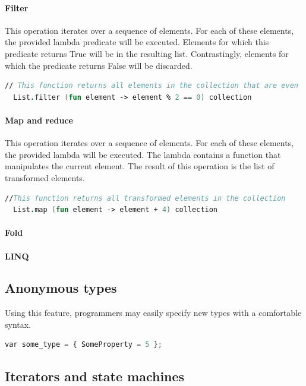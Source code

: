 \documentclass{article}
\begin{document}
\paragraph{Filter}
This operation iterates over a sequence of elements. For each of these elements, the provided lambda predicate will be executed.
Elements for which this predicate returns True will be in the resulting list. Contrastingly, elements for which the predicate returns False will be discarded.

\begin{lstlisting}[language=Fsharp]
  // This function returns all elements in the collection that are even
  List.filter (fun element -> element % 2 == 0) collection
\end{lstlisting}

\paragraph{Map and reduce}
This operation iterates over a sequence of elements. For each of these elements, the provided lambda will be executed.
The lambda contains a function that manipulates the current element. The result of this operation is the list of transformed elements.

\begin{lstlisting}[language=Fsharp]
  //This function returns all transformed elements in the collection
  List.map (fun element -> element + 4) collection
\end{lstlisting}
  
\paragraph{Fold}

\paragraph{LINQ}


\subsection{Anonymous types}
Using this feature, programmers may easily specify new types with a comfortable syntax.

\begin{lstlisting}[language=Python]
  var some_type = { SomeProperty = 5 };
\end{lstlisting}

\subsection{Iterators and state machines}
\end{document}
